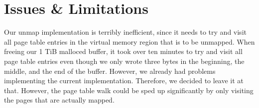 \section{Issues \& Limitations}
Our unmap implementation is terribly inefficient, since it needs to try and visit all page table
entries in the virtual memory region that is to be unmapped. When freeing our 1 TiB malloced buffer,
it took over ten minutes to try and visit all page table entries even though we only wrote three
bytes in the beginning, the middle, and the end of the buffer. However, we already had problems
implementing the current implementation. Therefore, we decided to leave it at that. However,
the page table walk could be sped up significantly by only visiting the pages that are actually mapped.

